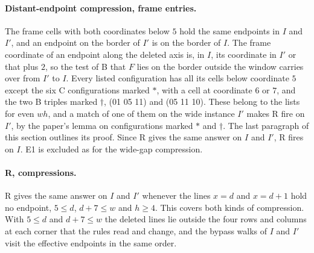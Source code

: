 \documentclass[11pt]{article}
\begin{document}
\paragraph{Distant-endpoint compression, frame entries.} The frame cells with both coordinates
below $5$ hold the same endpoints in $I$ and $I'$, and an endpoint on the border of $I'$ is on the
border of $I$. The frame coordinate of an endpoint along the deleted axis is, in $I$, its
coordinate in $I'$ or that plus $2$, so the test of B that $F$ lies on the border outside the
window carries over from $I'$ to $I$. Every listed configuration has all its cells below coordinate
$5$ except the six C configurations marked $*$, with a cell at coordinate $6$ or $7$, and the two
B triples marked $\dagger$, (01 05 11) and (05 11 10). These belong to the lists for even $wh$, and
a match of one of them on the wide instance $I'$ makes R fire on $I'$, by the paper's lemma on
configurations marked $*$ and $\dagger$. The last paragraph of this section outlines its proof.
Since R gives the same answer on $I$ and $I'$, R fires on $I$. E1 is excluded as for the wide-gap
compression.

\paragraph{R, compressions.} R gives the same answer on $I$ and $I'$ whenever the lines $x=d$ and
$x=d+1$ hold no endpoint, $5\le d$, $d+7\le w$ and $h\ge 4$. This covers both kinds of compression.
With $5\le d$ and $d+7\le w$ the deleted lines lie outside the four rows and columns at each
corner that the rules read and change, and the bypass walks of $I$ and $I'$ visit the effective
endpoints in the same order.

\end{document}
